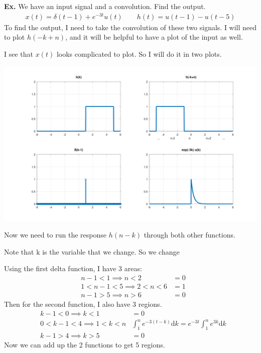 \documentclass[12pt,letterpaper]{article} \usepackage{amsmath} \usepackage{graphicx} \usepackage[margin=1in]{geometry} \usepackage{longtable}  \usepackage{amssymb}
\begin{document}
	\begin{mdframed}
		\textbf{Ex. } We have an input signal and a convolution. Find the output.
		\begin{align*}
			x(t) = \delta (t-1) + e^{-3t} u(t) \qquad h(t) = u(t-1) - u(t-5)
		\end{align*}
		To find the output, I need to take the convolution of these two signals. I will need to plot $h(-k+n)$, and it will be helpful to have a plot of the input as well.
		
		I see that $x(t)$ looks complicated to plot. So I will do it in two plots. 
		
		\centering
		\includegraphics[width=0.99\linewidth]{images/ex3}

		\raggedright
			
		Now we need to run the response $h(n-k)$ through both other functions.
		
		Note that k is the variable that we change. So we change 
		
		Using the first delta function, I have 3 areas:
		\begin{align*}
			&n-1<1 \implies n<2 & =0\\
			&1 < n-1 < 5 \implies 2 < n < 6 & =1\\
			&n-1 > 5 \implies n > 6 & =0
		\end{align*}
		Then for the second function, I also have 3 regions. 
		\begin{align*}
			& k -1 < 0 \implies k<1 & = 0\\
			&0 < k-1 < 4 \implies 1 < k < n & \int_1^{n} e^{-3(t-k)}\mathrm d k = e^{-3t} \int_1^n e^{3k} \mathrm d k\\
			&k-1 > 4 \implies k > 5 & =0
		\end{align*}
		Now we can add up the 2 functions to get 5 regions. 
	\end{mdframed}
	
\end{document}
